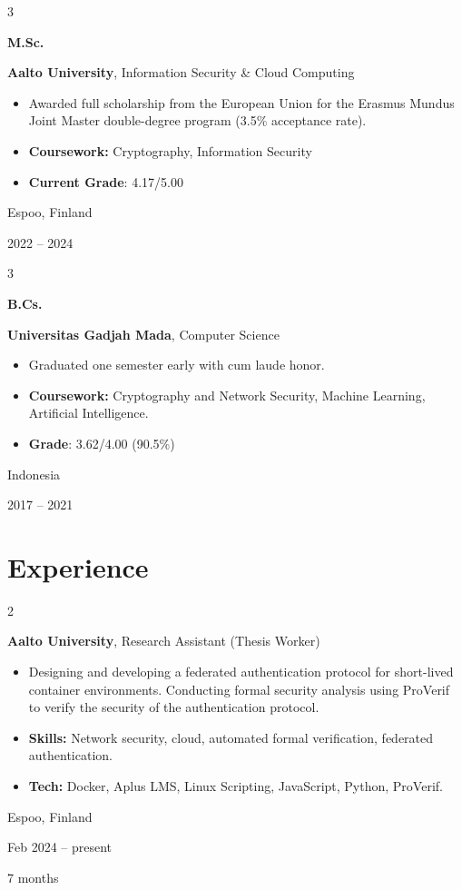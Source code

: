 \documentclass[10pt, a4paper]{article}
\newenvironment{highlights}{
    \begin{itemize}[
        topsep=0.10 cm,
        parsep=0.10 cm,
        partopsep=0pt,
        itemsep=0pt,
        leftmargin=0 cm + 10pt
    ]
}{
    \end{itemize}
} %
\newenvironment{twocolentry}[2][]{
    \onecolentry
    \def\secondColumn{#2}
    \setcolumnwidth{\fill, 3 cm}
    \begin{paracol}{2}
}{
    \switchcolumn \raggedleft \secondColumn
    \end{paracol}
    \endonecolentry
} %
\newenvironment{threecolentry}[3][]{
    \onecolentry
    \def\thirdColumn{#3}
    \setcolumnwidth{1 cm, \fill, 3 cm}
    \begin{paracol}{3}
    {\raggedright #2} \switchcolumn
}{
    \switchcolumn \raggedleft \thirdColumn
    \end{paracol}
    \endonecolentry
} %
\begin{document}
        \begin{threecolentry}{\textbf{M.Sc.}}{
            Espoo, Finland

        2022 – 2024
        }
            \textbf{Aalto University}, Information Security \& Cloud Computing
            \begin{highlights}
                \item Awarded full scholarship from the European Union for the Erasmus Mundus Joint Master double-degree program (3.5\% acceptance rate).
                \item \textbf{Coursework:} Cryptography, Information Security
                \item \textbf{Current Grade}: 4.17/5.00
            \end{highlights}
        \end{threecolentry}

        \vspace{0.2 cm}

        \begin{threecolentry}{\textbf{B.Cs.}}{
            Indonesia

        2017 – 2021
        }
            \textbf{Universitas Gadjah Mada}, Computer Science
            \begin{highlights}
                \item Graduated one semester early with cum laude honor.
                \item \textbf{Coursework:} Cryptography and Network Security, Machine Learning, Artificial Intelligence.
                \item \textbf{Grade}: 3.62/4.00 (90.5\%)
            \end{highlights}
        \end{threecolentry}


    
    \section{Experience}



        
        \begin{twocolentry}{
            Espoo, Finland

        Feb 2024 – present

        7 months
        }
            \textbf{Aalto University}, Research Assistant (Thesis Worker)
            \begin{highlights}
                \item Designing and developing a federated authentication protocol for short-lived container environments. Conducting formal security analysis using ProVerif to verify the security of the authentication protocol.
                \item \textbf{Skills:} Network security, cloud, automated formal verification, federated authentication.
                \item \textbf{Tech:} Docker, Aplus LMS, Linux Scripting, JavaScript, Python, ProVerif.
            \end{highlights}
        \end{twocolentry}
\end{document}
